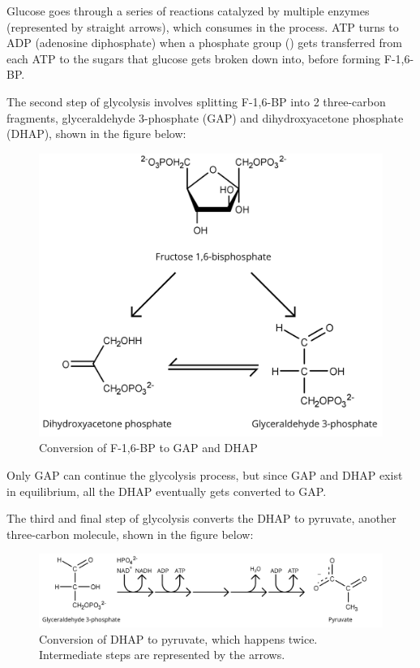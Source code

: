 \documentclass{article}
\begin{document}
Glucose goes through a series of reactions catalyzed by multiple enzymes (represented by straight arrows), which consumes  in the process. ATP turns to ADP (adenosine diphosphate) when a phosphate group () gets transferred from each ATP to the sugars that glucose gets broken down into, before forming F-1,6-BP.

\medskip

The second step of glycolysis involves splitting F-1,6-BP into 2 three-carbon fragments, glyceraldehyde 3-phosphate (GAP) and dihydroxyacetone phosphate (DHAP), shown in the figure below:
\begin{figure}[H]
    \centering
    \includegraphics[width=0.55\linewidth]{figures/figure_02.png}
    \caption{Conversion of F-1,6-BP to GAP and DHAP}
    \label{fig:figure1}
\end{figure}

Only GAP can continue the glycolysis process, but since GAP and DHAP exist in equilibrium, all the DHAP eventually gets converted to GAP.

\medskip

The third and final step of glycolysis converts the DHAP to pyruvate, another three-carbon molecule, shown in the figure below:
\begin{figure}[H]
    \centering
    \includegraphics[width=0.886\linewidth]{figures/figure_03.png}
    \caption{Conversion of DHAP to pyruvate, which happens twice. Intermediate steps are represented by the arrows.}
    \label{fig:figure1}
\end{figure}
\end{document}
